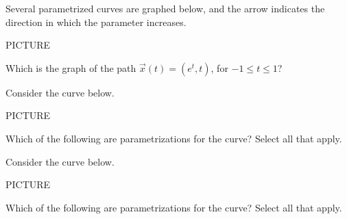 \documentclass{ximera}
\begin{document}
\begin{problem}
Several parametrized curves are graphed below, and the arrow indicates the direction in which the parameter increases.

PICTURE

Which is the graph of the path $\vec{x}(t) = (e^t, t)$, for $-1\leq t\leq 1$?
\begin{multipleChoice}
\end{multipleChoice}
\end{problem}

\begin{problem}
Consider the curve below.

PICTURE

Which of the following are parametrizations for the curve? Select all that apply.
\begin{selectAll}
\end{selectAll}
\end{problem}

\begin{problem}
Consider the curve below.

PICTURE

Which of the following are parametrizations for the curve? Select all that apply.
\begin{selectAll}
\end{selectAll}
\end{problem}
\end{document}
